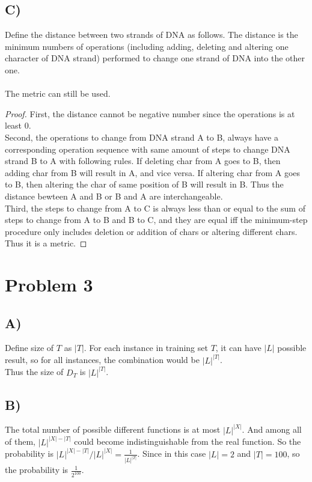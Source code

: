 \documentclass[11pt]{article}
\begin{document}
\subsection*{C)}
Define the distance between two strands of DNA as follows. The distance is the minimum numbers of operations (including adding, deleting and altering one character of DNA strand) performed to change one strand of DNA into the other one. \\ \\
The metric can still be used.
\begin{proof}
First, the distance cannot be negative number since the operations is at least 0.
\\Second, the operations to change from DNA strand A to B, always have a corresponding operation sequence with same amount of steps to change DNA strand B to A with following rules. If deleting char from A goes to B, then adding char from B will result in A, and vice versa. If altering char from A goes to B, then altering the char of same position of B will result in B. Thus the distance bewteen A and B or B and A are interchangeable.
\\Third, the steps to change from A to C is always less than or equal to the sum of steps to change from A to B and B to C, and they are equal iff the minimum-step procedure only includes deletion or addition of chars or altering different chars.
Thus it is a metric.
\end{proof}



\section*{Problem 3}

\subsection*{A)}
Define size of $T$ as $|T|$. For each instance in training set $T$, it can have $|L|$ possible result, so for all instances, the combination would be $|L|^{|T|}$.
\\Thus the size of $D_T$ is $|L|^{|T|}$.

\subsection*{B)}
The total number of possible different functions is at most $|L|^{|X|}$. And among all of them, $|L|^{|X|-|T|}$ could become indistinguishable from the real function. So the probability is  $|L|^{|X|-|T|} / |L|^{|X|} = \frac{1}{|L|^{|T|}}$.
Since in this case $|L|=2$ and $|T|=100$, so the probability is $\frac{1}{2^{100}}$.
\end{document}
